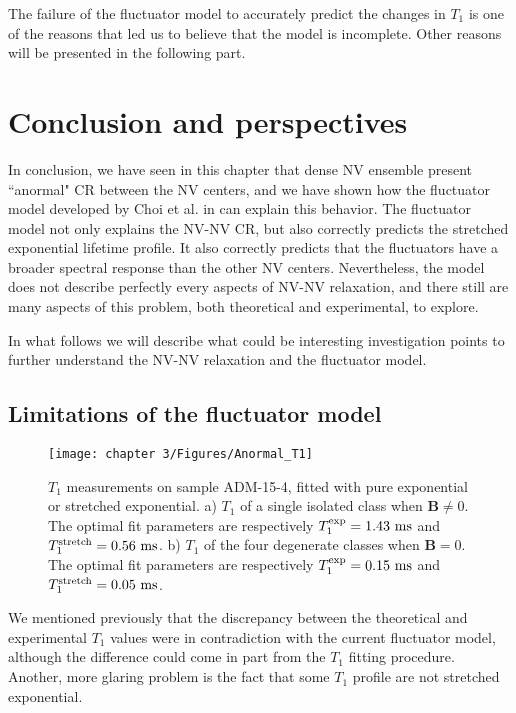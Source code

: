 \documentclass[a4paper, 11pt]{book}
\begin{document}
The failure of the fluctuator model to accurately predict the changes in $T_1$ is one of the reasons that led us to believe that the model is incomplete. Other reasons will be presented in the following part.

\section{Conclusion and perspectives}

In conclusion, we have seen in this chapter that dense NV ensemble present ``anormal" CR between the NV centers, and we have shown how the fluctuator model developed by Choi et al. in \citep{choi2017depolarization} can explain this behavior. The fluctuator model not only explains the NV-NV CR, but also correctly predicts the stretched exponential lifetime profile. It also correctly predicts that the fluctuators have a broader spectral response than the other NV centers. Nevertheless, the model does not describe perfectly every aspects of NV-NV relaxation, and there still are many aspects of this problem, both theoretical and experimental, to explore.

In what follows we will describe what could be interesting investigation points to further understand the NV-NV relaxation and the fluctuator model.

\subsection{Limitations of the fluctuator model}
\begin{figure}[h]
\centering
\texttt{[image: chapter 3/Figures/Anormal\_T1]}
\caption{$T_1$ measurements on sample ADM-15-4, fitted with pure exponential or stretched exponential. a) $T_1$ of a single isolated class when $\mathbf{B} \neq 0$. The optimal fit parameters are respectively $T_1^{\rm exp}=1.43\ \rm ms$ and $T_1^{\rm stretch}=0.56\ \rm ms$. b) $T_1$ of the four degenerate classes when $\mathbf{B}=0$. The optimal fit parameters are respectively $T_1^{\rm exp}=0.15\ \rm ms$ and $T_1^{\rm stretch}=0.05\ \rm ms$.}
\label{anormal T1}
\end{figure}

We mentioned previously that the discrepancy between the theoretical and experimental $T_1$  values were in contradiction with the current fluctuator model, although the difference could come in part from the $T_1$ fitting procedure. Another, more glaring problem is the fact that some $T_1$ profile are not stretched exponential.
\end{document}
